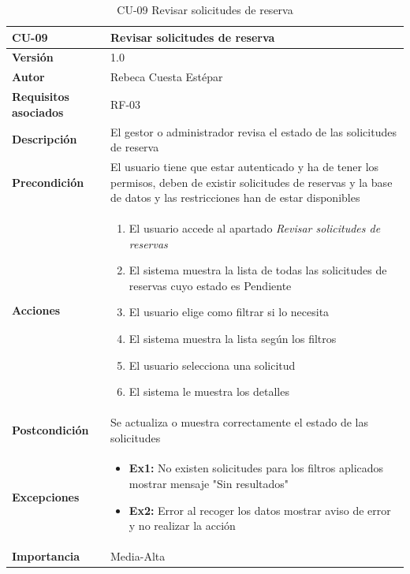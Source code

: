 \begin{table}[p]
	\centering
	\begin{tabularx}{\linewidth}{ p{} p{} }
		\toprule
		\textbf{CU-09}    & \textbf{Revisar solicitudes de reserva}\\
		\toprule
		\textbf{Versión}              & 1.0    \\
		\textbf{Autor}                & Rebeca Cuesta Estépar \\
		\textbf{Requisitos asociados} & RF-03 \\
		\textbf{Descripción}          & El gestor o administrador revisa el estado de las solicitudes de reserva \\
		\textbf{Precondición}         & El usuario tiene que estar autenticado y ha de tener los permisos, deben de existir solicitudes de reservas y la base de datos y las restricciones han de estar disponibles \\
		\textbf{Acciones}             &
		\begin{enumerate}
			\def\labelenumi{\arabic{enumi}.}
			\tightlist
			\item El usuario accede al apartado \emph{Revisar solicitudes de reservas}
			\item El sistema muestra la lista de todas las solicitudes de reservas cuyo estado es Pendiente
			\item El usuario elige como filtrar si lo necesita
			\item El sistema muestra la lista según los filtros
			\item El usuario selecciona una solicitud
			\item El sistema le muestra los detalles
		\end{enumerate}\\
		\textbf{Postcondición} & Se actualiza o muestra correctamente el estado de las solicitudes \\
		\textbf{Excepciones}          &  
		\begin{itemize}
			\tightlist
			\item \textbf{Ex1:} No existen solicitudes para los filtros aplicados \textrightarrow{} mostrar mensaje "Sin resultados"
			\item \textbf{Ex2:} Error al recoger los datos \textrightarrow{} mostrar aviso de error y no realizar la acción
		\end{itemize}\\
		\textbf{Importancia}          & Media-Alta \\
		\bottomrule
	\end{tabularx}
	\caption{CU-09 Revisar solicitudes de reserva}
\end{table}

